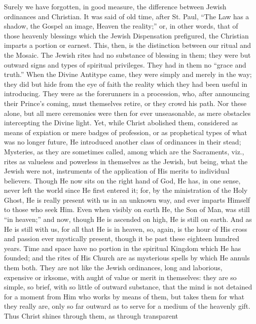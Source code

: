 Surely we have forgotten, in good measure, the difference between
Jewish ordinances and Christian. It was said of old time, after St.
Paul, ``The Law has a shadow, the Gospel an image, Heaven the
reality;'' or, in other words, that of those heavenly blessings
which the Jewish Dispensation prefigured, the Christian imparts a
portion or earnest. This, then, is the distinction between our ritual
and the Mosaic. The Jewish rites had no substance of blessing in them;
they were but outward signs and types of spiritual privileges. They
had in them no ``grace and truth.'' When the Divine Antitype
came, they were simply and merely in the way; they did but hide from
the eye of faith the reality which they had been useful in introducing.
They were as the forerunners in a procession, who, after announcing
their Prince's coming, must themselves retire, or they crowd his
path. Nor these alone, but all mere ceremonies were then for ever
unseasonable, as mere obstacles intercepting the Divine light. Yet,
while Christ abolished them, considered as means of expiation or mere
badges of profession, or as prophetical types of what was no longer
future, He introduced another class of ordinances in their stead;
Mysteries, as they are sometimes called, among which are the
Sacraments, viz., rites as valueless and powerless in themselves as
the Jewish, but being, what the Jewish were not, instruments of the
application of His merits to individual believers. Though He now sits
on the right hand of God, He has, in one sense, never left the world
since He first entered it; for, by the ministration of the Holy Ghost,
He is really present with us in an unknown way, and ever imparts
Himself to those who seek Him. Even when visibly on earth He, the Son
of Man, was still ``in heaven;'' and now, though He is
ascended on high, He is still on earth. And as He is still with us,
for all that He is in heaven, so, again, is the hour of His cross and
passion ever mystically present, though it be past these eighteen
hundred years. Time and space have no portion in the spiritual Kingdom
which He has founded; and the rites of His Church are as mysterious
spells by which He annuls them both. They are not like the Jewish
ordinances, long and laborious, expensive or irksome, with aught of
value or merit in themselves: they are so simple, so brief, with so
little of outward substance, that the mind is not detained for a
moment from Him who works by means of them, but takes them for what
they really are, only so far outward as to serve for a medium of the
heavenly gift. Thus Christ shines through them, as through transparent
